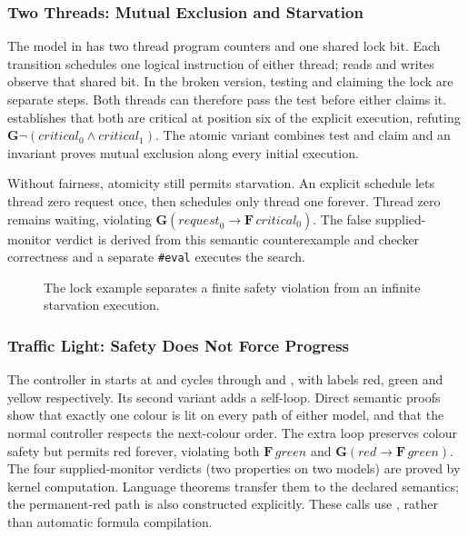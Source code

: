 \subsubsection{Two Threads: Mutual Exclusion and Starvation}

The model in  has two thread
program counters and one shared lock bit. Each transition schedules one
logical instruction of either thread; reads and writes observe that shared
bit. In the broken version, testing and claiming the lock are separate
steps. Both threads can therefore pass the test before either claims it.
 establishes that both are critical at position six of
the explicit execution, refuting
$\mathbf{G}\neg(\mathit{critical}_0\land\mathit{critical}_1)$.
The atomic variant combines test and claim and an invariant proves mutual
exclusion along every initial execution.

Without fairness, atomicity still permits starvation. An explicit schedule
lets thread zero request once, then schedules only thread one forever.
Thread zero remains waiting, violating
$\mathbf{G}(\mathit{request}_0\rightarrow
\mathbf{F}\,\mathit{critical}_0)$.
The false supplied-monitor verdict is derived from this semantic
counterexample and checker correctness and a separate \texttt{\#eval}
executes the search.

\begin{figure}[!ht]
  \centering
  \resizebox{\linewidth}{!}{}
  \caption{The lock example separates a finite safety violation from an
    infinite starvation execution.}
  \label{fig:example-lock}
\end{figure}

\subsubsection{Traffic Light: Safety Does Not Force Progress}

The controller in  starts at
 and cycles through  and , with labels red,
green and yellow respectively. Its second variant adds a 
self-loop. Direct semantic proofs show that exactly one colour is lit on
every path of either model, and that the normal controller respects the
next-colour order. The extra loop preserves colour safety but permits red
forever, violating both $\mathbf{F}\,\mathit{green}$ and
$\mathbf{G}(\mathit{red}\rightarrow\mathbf{F}\,\mathit{green})$.
The four supplied-monitor verdicts (two properties on two models) are proved
by kernel computation. Language theorems transfer them to the declared
semantics; the permanent-red path is also constructed explicitly.
These calls use , rather than automatic formula compilation.

